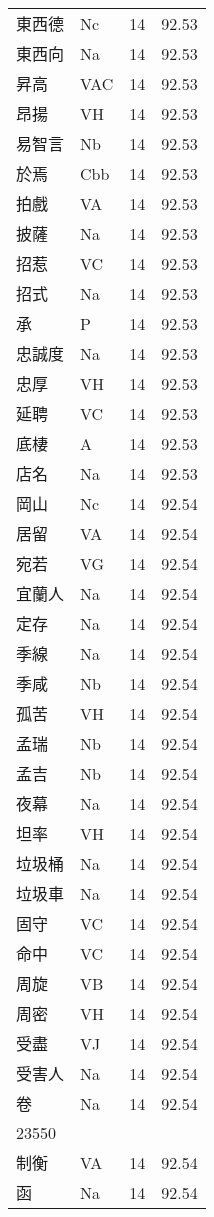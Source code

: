 \documentclass[twocolumn]{book}
\begin{document}
\begin{supertabular}{llrr}
東西德 & Nc & 14 &  92.53\\
東西向 & Na & 14 &  92.53\\
昇高 & VAC & 14 &  92.53\\
昂揚 & VH & 14 &  92.53\\
易智言 & Nb & 14 &  92.53\\
於焉 & Cbb & 14 &  92.53\\
拍戲 & VA & 14 &  92.53\\
披薩 & Na & 14 &  92.53\\
招惹 & VC & 14 &  92.53\\
招式 & Na & 14 &  92.53\\
承 & P & 14 &  92.53\\
忠誠度 & Na & 14 &  92.53\\
忠厚 & VH & 14 &  92.53\\
延聘 & VC & 14 &  92.53\\
底棲 & A & 14 &  92.53\\
店名 & Na & 14 &  92.53\\
岡山 & Nc & 14 &  92.54\\
居留 & VA & 14 &  92.54\\
宛若 & VG & 14 &  92.54\\
宜蘭人 & Na & 14 &  92.54\\
定存 & Na & 14 &  92.54\\
季線 & Na & 14 &  92.54\\
季咸 & Nb & 14 &  92.54\\
孤苦 & VH & 14 &  92.54\\
孟瑞 & Nb & 14 &  92.54\\
孟吉 & Nb & 14 &  92.54\\
夜幕 & Na & 14 &  92.54\\
坦率 & VH & 14 &  92.54\\
垃圾桶 & Na & 14 &  92.54\\
垃圾車 & Na & 14 &  92.54\\
固守 & VC & 14 &  92.54\\
命中 & VC & 14 &  92.54\\
周旋 & VB & 14 &  92.54\\
周密 & VH & 14 &  92.54\\
受盡 & VJ & 14 &  92.54\\
受害人 & Na & 14 &  92.54\\
卷 & Na & 14 &  92.54\\
23550\\
制衡 & VA & 14 &  92.54\\
函 & Na & 14 &  92.54\\

\end{supertabular}
\end{document}
